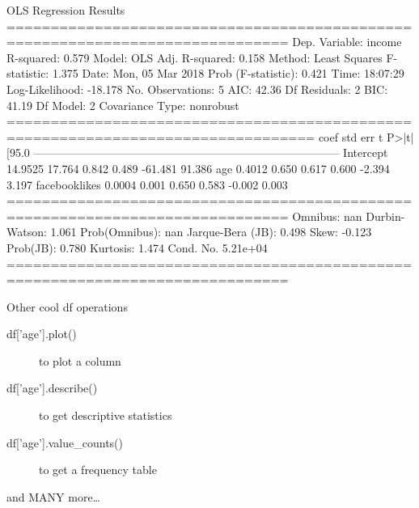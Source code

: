 \documentclass[compress]{beamer}
\begin{document}
\begin{frame}{}

\begin{lstlistingoutputtiny}
OLS Regression Results                            
==============================================================================
Dep. Variable:                 income   R-squared:                       0.579
Model:                            OLS   Adj. R-squared:                  0.158
Method:                 Least Squares   F-statistic:                     1.375
Date:                Mon, 05 Mar 2018   Prob (F-statistic):              0.421
Time:                        18:07:29   Log-Likelihood:                -18.178
No. Observations:                   5   AIC:                             42.36
Df Residuals:                       2   BIC:                             41.19
Df Model:                           2                                         
Covariance Type:            nonrobust                                         
=================================================================================
coef    std err          t      P>|t|      [95.0%
---------------------------------------------------------------------------------
Intercept        14.9525     17.764      0.842      0.489       -61.481    91.386
age               0.4012      0.650      0.617      0.600        -2.394     3.197
facebooklikes     0.0004      0.001      0.650      0.583        -0.002     0.003
==============================================================================
Omnibus:                          nan   Durbin-Watson:                   1.061
Prob(Omnibus):                    nan   Jarque-Bera (JB):                0.498
Skew:                          -0.123   Prob(JB):                        0.780
Kurtosis:                       1.474   Cond. No.                     5.21e+04
==============================================================================

\end{lstlistingoutputtiny}
	
\end{frame}




\begin{frame}[fragile]{Other cool df operations}
\begin{description}
	\item[df{['age']}.plot()] to plot a column
	\item[df{['age']}.describe()] to get descriptive statistics 
	\item[df{['age']}.value\_counts()] to get a frequency table
\end{description}
and MANY more\ldots
	
\end{frame}
\end{document}
